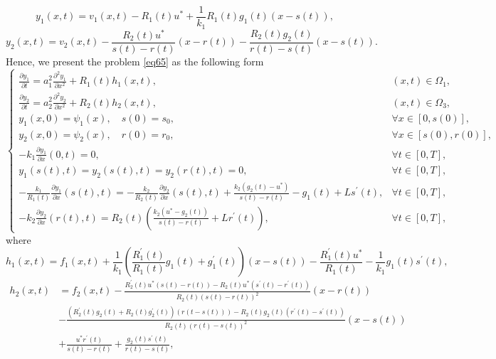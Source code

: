 \documentclass[preprint,12pt,authoryear]{elsarticle}
\begin{document}
\begin{equation}\label{eq70}
    y_1(x,t)=v_1(x,t)-R_1(t)u^*+\frac{1}{k_1}R_1(t)g_1(t)(x-s(t)),
\end{equation}
\begin{equation}\label{eq71}
    y_2(x,t)=v_2(x,t)-\frac{R_2(t)u^*}{s(t)-r(t)}(x-r(t))-\frac{R_2(t)g_2(t)}{r(t)-s(t)}(x-s(t)).
\end{equation}
Hence, we present the problem \eqref{eq65} as the following form
\begin{equation}\label{eq72}
    \begin{cases}
        \frac{\partial y_1}{\partial t}=a_1^2\frac{\partial^2 y_1}{\partial x^2}+R_1(t)h_1(x,t),&(x,t)\in\Omega_1,\\
        \frac{\partial y_2}{\partial t}=a_2^2\frac{\partial^2 y_2}{\partial x^2}+R_2(t)h_2(x,t),&(x,t)\in\Omega_3,\\
        y_1(x,0)=\psi_1(x),\quad s(0)=s_0,&\forall x\in[0,s(0)],\\
        y_2(x,0)=\psi_2(x),\quad r(0)=r_0,&\forall x\in[s(0),r(0)],\\
        -k_1\frac{\partial y_1}{\partial x}(0,t)=0,&\forall t\in[0,T],\\
        y_1(s(t),t)=y_2(s(t),t)=y_2(r(t),t)=0,&\forall t\in[0,T],\\
        -\frac{k_1}{R_1(t)}\frac{\partial y_1}{\partial x}(s(t),t)=-\frac{k_2}{R_2(t)}\frac{\partial y_2}{\partial x}(s(t),t)+\frac{k_2(g_2(t)-u^*)}{s(t)-r(t)}-g_1(t)+Ls^{\prime}(t),&\forall t\in[0,T],\\
        -k_2\frac{\partial y_2}{\partial x}(r(t),t)=R_2(t)\left(\frac{k_2(u^*-g_2(t))}{s(t)-r(t)}+Lr^{\prime}(t)\right),&\forall t\in[0,T],
    \end{cases}
\end{equation}
where
\begin{equation}\label{eq73}
    h_1(x,t)=f_1(x,t)+\frac{1}{k_1}\left(\frac{R_1^{\prime}(t)}{R_1(t)}g_1(t)+g_1^{\prime}(t)\right)(x-s(t))-\frac{R_1^{\prime}(t)u^*}{R_1(t)}-\frac{1}{k_1}g_1(t)s^{\prime}(t),
\end{equation}
\begin{equation}\label{eq74}
    \begin{split}
        h_2(x,t)&=f_2(x,t)-\frac{R_2^{\prime}(t)u^*(s(t)-r(t))-R_2(t)u^*(s^{\prime}(t)-r^{\prime}(t))}{R_2(t)(s(t)-r(t))^2}(x-r(t))\\
        &-\frac{(R_2^{\prime}(t)g_2(t)+R_2(t)g_2^{\prime}(t))(r(t-s(t)))-R_2(t)g_2(t)(r^{\prime}(t)-s^{\prime}(t))}{R_2(t)(r(t)-s(t))^2}(x-s(t))\\
        &+\frac{u^*r^{\prime}(t)}{s(t)-r(t)}+\frac{g_2(t)s^{\prime}(t)}{r(t)-s(t)},
    \end{split}
\end{equation}
\end{document}
